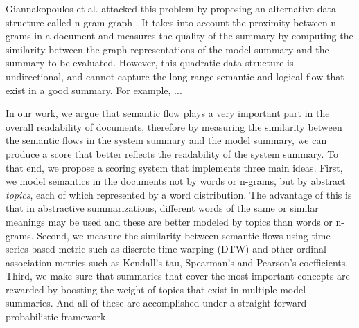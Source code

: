 Giannakopoulos et al. attacked this problem by proposing an alternative
data structure called n-gram graph \cite{giannakopoulos2008summarization}. It takes into account the
proximity between n-grams in a document and measures the quality of the 
summary by computing the similarity between the graph representations of
the model summary and the summary to be evaluated. However, this quadratic 
data structure is undirectional, and cannot capture the long-range semantic
and logical flow that exist in a good summary. For example, ...

% 
%
%

In our work, we argue that semantic flow plays a very important part in
the overall readability of documents, therefore by measuring the similarity
between the semantic flows in the system summary and the model summary, 
we can produce a score that better reflects the readability of the system 
summary. To that end, we propose a scoring system that implements three 
main ideas. First, we model semantics in the documents not by words 
or n-grams, but by abstract {\em topics}, each of which represented by 
a word distribution. The advantage of this is that in abstractive 
summarizations, different words of the same or similar meanings may be used
and these are better modeled by topics than words or n-grams. Second,
we measure the similarity between semantic flows using time-series-based metric
such as discrete time warping (DTW) and other ordinal association metrics
such as Kendall's tau, Spearman's and Pearson's coefficients. Third, we 
make sure that summaries that cover the most important concepts are rewarded
by boosting the weight of topics that exist in multiple model summaries.
And all of these are accomplished under a straight forward probabilistic 
framework.

